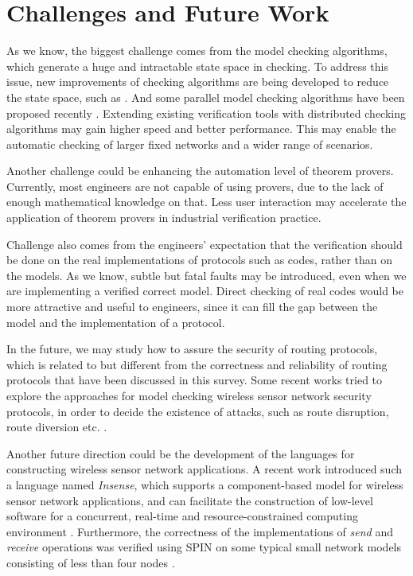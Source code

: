 \documentclass[a4paper,10pt,twocolumn]{article}
\begin{document}
\section{Challenges and Future Work}
\label{Sec:future}
As we know, the biggest challenge comes from the model checking algorithms, which generate a huge and intractable state space in checking. To address this issue, new improvements of checking algorithms are being developed to reduce the state space, such as \cite{CM10b}. And some parallel model checking algorithms have been proposed recently \cite{BHV00,BBS01}. Extending existing verification tools with distributed checking algorithms may gain higher speed and better performance. This may enable the automatic checking of larger fixed networks and a wider range of scenarios.

Another challenge could be enhancing the automation level of theorem provers. Currently, most engineers are not capable of using provers, due to the lack of enough mathematical knowledge on that. Less user interaction may accelerate the application of theorem provers in industrial verification practice.

Challenge also comes from the engineers' expectation that the verification should be done on the real implementations of protocols such as codes, rather than on the models. As we know, subtle but fatal faults may be introduced, even when we are implementing a verified correct model. Direct checking of real codes would be more attractive and useful to engineers, since it can fill the gap between the model and the implementation of a protocol.

In the future, we may study how to assure the security of routing protocols, which is related to but different from the correctness and reliability of routing protocols that have been discussed in this survey. Some recent works tried to explore the approaches for model checking wireless sensor network security protocols, in order to decide the existence of attacks, such as route disruption, route diversion etc. \cite{TCCDC09,BMV10}.

Another future direction could be the development of the languages for constructing wireless sensor network applications. A recent work introduced such a language named \emph{Insense}, which supports a component-based model for wireless sensor network applications, and can facilitate the construction of low-level software for a concurrent, real-time and resource-constrained computing environment \cite{DBLM08}. Furthermore, the correctness of the implementations of \emph{send} and \emph{receive} operations was verified using SPIN on some typical small network models consisting of less than four nodes \cite{SLMDBMS09}.
\end{document}
